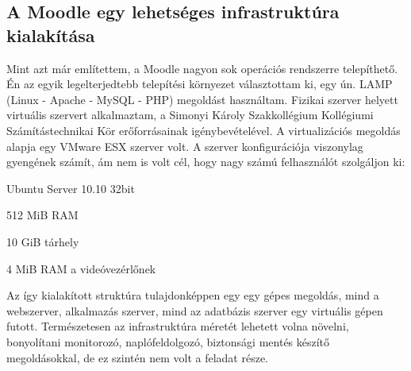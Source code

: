 \subsection{A Moodle egy lehetséges infrastruktúra kialakítása}

Mint azt már említettem, a Moodle nagyon sok operációs rendszerre telepíthető. Én az egyik legelterjedtebb telepítési környezet választottam ki, egy ún. LAMP (Linux - Apache - MySQL - PHP) megoldást használtam. Fizikai szerver helyett virtuális szervert alkalmaztam, a Simonyi Károly Szakkollégium Kollégiumi Számítástechnikai Kör erőforrásainak igénybevételével. A virtualizációs megoldás alapja egy VMware ESX szerver volt.
A szerver konfigurációja viszonylag gyengének számít, ám nem is volt cél, hogy nagy számú felhasználót szolgáljon ki:
\begin{sajat_itemize}
\item Ubuntu Server 10.10 32bit
\item 512 MiB RAM
\item 10 GiB tárhely
\item 4 MiB RAM a videóvezérlőnek 
\end{sajat_itemize}
Az így kialakított struktúra tulajdonképpen egy egy gépes megoldás, mind a webszerver, alkalmazás szerver, mind az adatbázis szerver egy virtuális gépen futott. Természetesen az infrastruktúra méretét lehetett volna növelni, bonyolítani monitorozó, naplófeldolgozó, biztonsági mentés készítő megoldásokkal, de ez szintén nem volt a feladat része.
